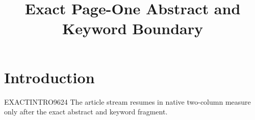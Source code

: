 \documentclass{tnqjournal}
\title{Exact Page-One Abstract and Keyword Boundary}
\begin{document}
\maketitle
\section{Introduction}
EXACTINTRO9624 The article stream resumes in native two-column measure only after the exact abstract and keyword fragment.
\end{document}
